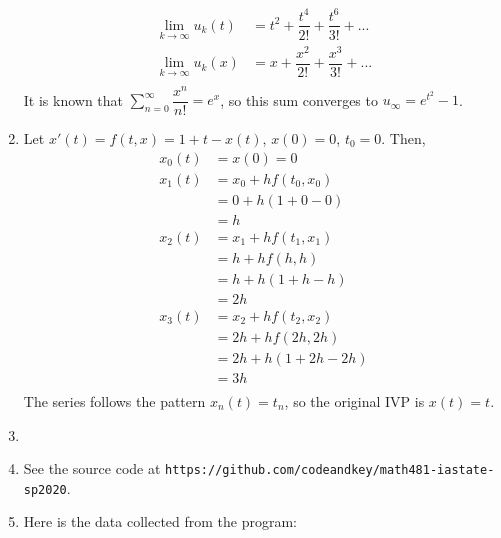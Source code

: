 \documentclass{article}
\begin{document}
\begin{enumerate}
        \begin{equation*}
            \begin{split}
                \lim_{k\rightarrow\infty}u_k(t) & = t^2 + \dfrac{t^4}{2!} + \dfrac{t^6}{3!} + ... \\
                \lim_{k\rightarrow\infty}u_k(x) & = x + \dfrac{x^2}{2!} + \dfrac{x^3}{3!} + ... \\
            \end{split}
        \end{equation*}
        It is known that $\sum_{n=0}^{\infty} \dfrac{x^n}{n!} = e^x$, so this sum converges to $u_{\infty}=e^{t^2}-1$. \\
    \item
        Let $x'(t) = f(t, x) = 1 + t - x(t)$, $x(0)=0$, $t_0=0$. Then, \\
        \begin{equation*}
            \begin{split}
                x_0(t) & = x(0) = 0 \\
                x_1(t) & = x_0 + hf(t_0, x_0) \\
                       & = 0 + h(1 + 0 - 0) \\
                       & = h \\
                x_2(t) & = x_1 + hf(t_1, x_1) \\
                       & = h + hf(h, h) \\
                       & = h + h(1 + h - h) \\
                       & = 2h \\
                x_3(t) & = x_2 + hf(t_2, x_2) \\
                       & = 2h + hf(2h, 2h) \\
                       & = 2h + h(1 + 2h - 2h) \\
                       & = 3h \\
            \end{split}
        \end{equation*}
        The series follows the pattern $x_n(t) = t_n$, so the original IVP is $x(t) = t$. \\
    \item
    \item
        See the source code at \texttt{https://github.com/codeandkey/math481-iastate-sp2020}. \\
    \item
        Here is the data collected from the program: \\

\end{enumerate}
\end{document}
